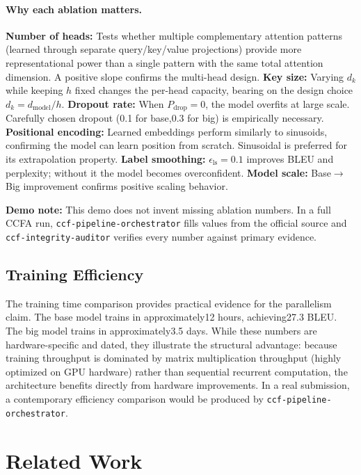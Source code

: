 ﻿\documentclass{article}
\begin{document}
\paragraph{Why each ablation matters.}
\textbf{Number of heads:} Tests whether multiple complementary attention patterns (learned through separate query/key/value projections) provide more representational power than a single pattern with the same total attention dimension. A positive slope confirms the multi-head design.
\textbf{Key size:} Varying $d_k$ while keeping $h$ fixed changes the per-head capacity, bearing on the design choice $d_k = d_{\text{model}}/h$.
\textbf{Dropout rate:} When $P_{\text{drop}}=0$, the model overfits at large scale. Carefully chosen dropout (0.1 for base,0.3 for big) is empirically necessary.
\textbf{Positional encoding:} Learned embeddings perform similarly to sinusoids, confirming the model can learn position from scratch. Sinusoidal is preferred for its extrapolation property.
\textbf{Label smoothing:} $\epsilon_{\text{ls}}=0.1$ improves BLEU and perplexity; without it the model becomes overconfident.
\textbf{Model scale:} Base$\to$Big improvement confirms positive scaling behavior.

\textbf{Demo note:} This demo does not invent missing ablation numbers. In a full CCFA run, \texttt{ccf-pipeline-orchestrator} fills values from the official source and \texttt{ccf-integrity-auditor} verifies every number against primary evidence.

\subsection{Training Efficiency}

The training time comparison provides practical evidence for the parallelism claim. The base model trains in approximately12 hours, achieving27.3 BLEU. The big model trains in approximately3.5 days. While these numbers are hardware-specific and dated, they illustrate the structural advantage: because training throughput is dominated by matrix multiplication throughput (highly optimized on GPU hardware) rather than sequential recurrent computation, the architecture benefits directly from hardware improvements. In a real submission, a contemporary efficiency comparison would be produced by \texttt{ccf-pipeline-orchestrator}.


\section{Related Work}
\end{document}
